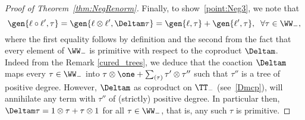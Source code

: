 \documentclass{article}
\begin{document}
\begin{proof}[Proof of Theorem~\ref{thm:NegRenorm}]
Finally, to show~\ref{point:Neg3}, we note that
\[
\gen{\ell \circ \ell', \tau} = \gen{\ell \otimes \ell', \Deltam \tau} = \gen{\ell,\tau} + \gen{\ell',\tau}, \; \; \forall \tau \in \WW_-,
\]
where the first equality follows by definition and the second from the fact that every element of $\WW_-$ is primitive with respect to the coproduct $\Deltam$. Indeed from the Remark \ref{cured_trees}, we deduce that the coaction $\Deltam$ maps every  $ \tau \in  \WW_- $ into $ \tau \otimes \one + \sum_{(\tau)} \tau' \otimes \tau'' $ such that $ \tau'' $ is a tree of positive degree. However, $\Deltam$ as coproduct on $\TT_-$ (see~\eqref{Dmcp}), will annihilate any term with $\tau''$ of (strictly) positive degree. In particular then, $\Deltam \tau = 1 \otimes \tau + \tau \otimes 1$ for all $\tau \in \WW_-$, that is, any such $\tau$ is primitive.
\end{proof}


\appendix 



 
%

\end{document}
